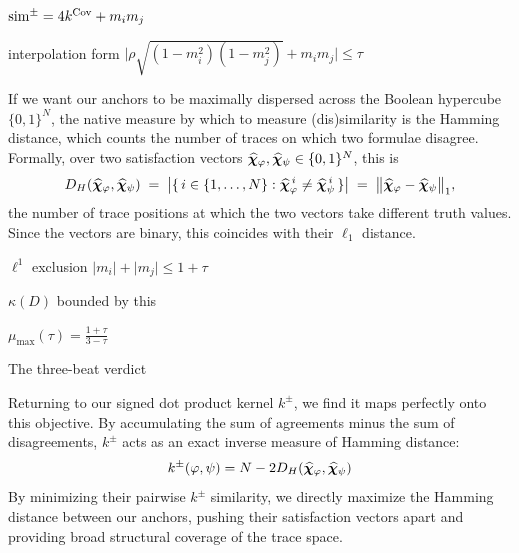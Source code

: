 \documentclass[titlepage,a4paper,11pt]{report}
\begin{document}
    $\mathrm{sim}^\pm = 4k^{\mathrm{Cov}} + m_im_j$

    interpolation form $\lvert\rho\sqrt{(1-m_i^2)(1-m_j^2)} + m_im_j\rvert \le \tau$
    
    If we want our anchors to be maximally dispersed across the Boolean hypercube $\{0,1\}^N$, the native measure by which to measure (dis)similarity is the Hamming distance, which counts the number of traces on which two formulae disagree. Formally, over two satisfaction vectors $\bm{\widehat\chi}_\varphi, \bm{\widehat\chi}_\psi \in \{0,1\}^N$, this is
    \begin{equation}
        D_H(\bm{\widehat\chi}_\varphi, \bm{\widehat\chi}_\psi) \;=\; \big|\{\, i \in \{1,\dots,N\} : \bm{\widehat\chi}_\varphi^{\,i} \neq \bm{\widehat\chi}_\psi^{\,i} \,\}\big| \;=\; \big\lVert \bm{\widehat\chi}_\varphi - \bm{\widehat\chi}_\psi \big\rVert_1,
        \label{eq:hamming_distance}
    \end{equation}
    the number of trace positions at which the two vectors take different truth values. Since the vectors are binary, this coincides with their $\ell_1$ distance.

    $\ell^1$ exclusion $\lvert m_i\rvert + \lvert m_j\rvert \le 1+\tau$

    $\kappa(D)$ bounded by this

     $\mu_{\max}(\tau) = \frac{1+\tau}{3-\tau}$

    The three-beat verdict
    
    Returning to our signed dot product kernel $k^\pm$, we find it maps perfectly onto this objective. By accumulating the sum of agreements minus the sum of disagreements, $k^\pm$ acts as an exact inverse measure of Hamming distance:
    \begin{equation}
        k^\pm(\varphi, \psi) = N - 2 D_H(\bm{\widehat\chi}_\varphi, \bm{\widehat\chi}_\psi)
    \end{equation}
    By minimizing their pairwise $k^\pm$ similarity, we directly maximize the Hamming distance between our anchors, pushing their satisfaction vectors apart and providing broad structural coverage of the trace space.
\end{document}
